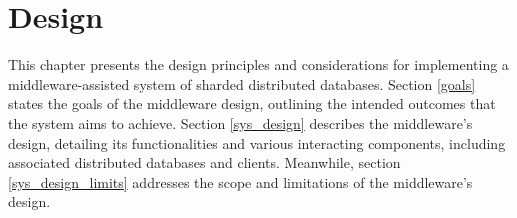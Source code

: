 
\chapter{Design}\label{ch:design}
This chapter presents the design principles and considerations for implementing a middleware-assisted system of sharded distributed databases. Section \ref{goals} states the goals of the middleware design, outlining the intended outcomes that the system aims to achieve. Section \ref{sys_design} describes the middleware's design, detailing its functionalities and various interacting components, including associated distributed databases and clients. Meanwhile, section \ref{sys_design_limits} addresses the scope and limitations of the middleware's design.


